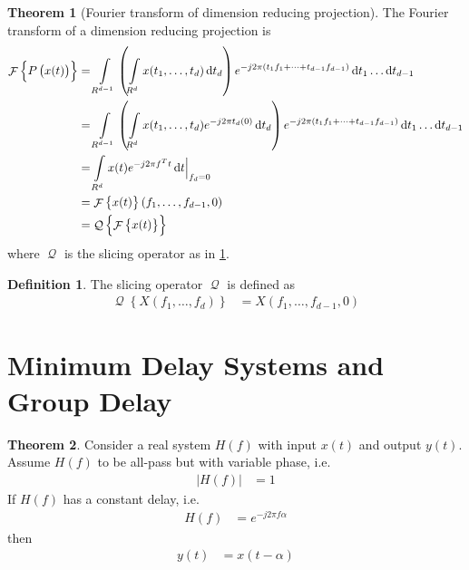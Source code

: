 \documentclass[titlepage, fleqn, a4paper, 12pt, twoside]{article}
\theoremstyle{definition}
\newtheorem{definition}{Definition}
\theoremstyle{theorem}
\newtheorem{theorem}{Theorem}
\DeclareMathOperator{\FT}{\mathcal{F}}
\DeclareMathOperator{\Q}{\mathcal{Q}}
\begin{document}
\begin{theorem}[Fourier transform of dimension reducing projection]
	The Fourier transform of a dimension reducing projection is
	\begin{align*}
		\FT\left\{ P\left( x(t) \right) \right\} &= \int\limits_{R^{d - 1}} \left( \int\limits_{R^d} x(t_1,\dots,t_d) \dif t_d \right) e^{-j 2 \pi (t_1 f_1 + \dots + t_{d - 1} f_{d - 1})} \dif t_1 \dots \dif t_{d - 1}\\
		&= \int\limits_{R^{d - 1}} \left( \int\limits_{R^d} x(t_1,\dots,t_d) e^{-j 2 \pi t_d (0)} \dif t_d \right) e^{-j 2 \pi (t_1 f_1 + \dots + t_{d - 1} f_{d - 1})} \dif t_1 \dots \dif t_{d - 1}\\
		&= \int\limits_{R^d} x(t) e^{-j 2 \pi f^T t} \dif t \Big|_{f_d = 0}\\
		&= \FT\left\{ x(t) \right\}(f_1,\dots,f_{d - 1},0)\\
		&= \Q\left\{ \FT\left\{ x(t) \right\} \right\}
	\end{align*}
	where $\Q$ is the slicing operator as in \cref{def:slicing_operator}.
	\label{thm:Fourier_transform_of_dimension_reducing_projection}
\end{theorem}

\begin{definition}
	The slicing operator $\Q$ is defined as
	\begin{align*}
		\Q\left\{ X(f_1,\dots,f_d) \right\} &= X\left( f_1,\dots,f_{d - 1},0 \right)
	\end{align*}
	\label{def:slicing_operator}
\end{definition}

\clearpage
\part{Minimum Delay Systems and Group Delay}

\begin{theorem}
	Consider a real system $H(f)$ with input $x(t)$ and output $y(t)$.
	Assume $H(f)$ to be all-pass but with variable phase, i.e.
	\begin{align*}
		\left| H(f) \right| &= 1
	\end{align*}
	If $H(f)$ has a constant delay, i.e.
	\begin{align*}
		H(f) &= e^{-j 2 \pi f \alpha}
	\end{align*}
	then
	\begin{align*}
		y(t) &= x(t - \alpha)
	\end{align*}
\end{theorem}
\end{document}
